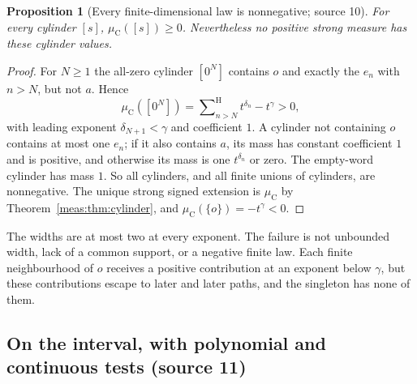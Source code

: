 \documentclass[11pt]{article}
\numberwithin{equation}{section}
\newtheorem{proposition}[theorem]{Proposition}
\theoremstyle{definition}
\theoremstyle{remark}
\newcommand{\hsum}{\mathop{\sum}\nolimits^{\mathrm H}}
\begin{document}
\begin{proposition}[Every finite-dimensional law is nonnegative; source 10]
\label{meas:prop:hidden-positive}
For every cylinder $[s]$, $\mu_{\mathrm C}([s])\ge0$. Nevertheless no positive
strong measure has these cylinder values.
\end{proposition}
\begin{proof}
For $N\ge1$ the all-zero cylinder $[0^N]$ contains $o$ and exactly the $e_n$
with $n>N$, but not $a$. Hence
\begin{equation}\label{meas:eq:zero-cylinder}
 \mu_{\mathrm C}([0^N])=\hsum_{n>N}t^{\delta_n}-t^\gamma>0,
\end{equation}
with leading exponent $\delta_{N+1}<\gamma$ and coefficient $1$. A cylinder not
containing $o$ contains at most one $e_n$; if it also contains $a$, its mass has
constant coefficient $1$ and is positive, and otherwise its mass is one
$t^{\delta_n}$ or zero. The empty-word cylinder has mass $1$. So all cylinders,
and all finite unions of cylinders, are nonnegative. The unique strong signed
extension is $\mu_{\mathrm C}$ by Theorem~\ref{meas:thm:cylinder}, and
$\mu_{\mathrm C}(\{o\})=-t^\gamma<0$.
\end{proof}

The widths are at most two at every exponent. The failure is not unbounded
width, lack of a common support, or a negative finite law. Each finite
neighbourhood of $o$ receives a positive contribution at an exponent below
$\gamma$, but these contributions escape to later and later paths, and the
singleton has none of them.

\subsection{On the interval, with polynomial and continuous tests (source 11)}
\end{document}
